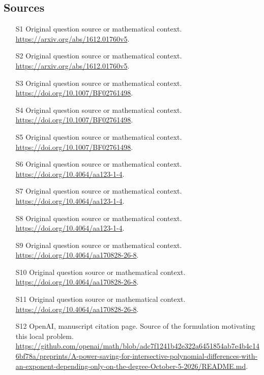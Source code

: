 \documentclass[11pt]{article}
\begin{document}
\subsection{Sources}
\begin{itemize}
\item[S1] Original question source or mathematical context.
\url{https://arxiv.org/abs/1612.01760v5}.
\item[S2] Original question source or mathematical context.
\url{https://arxiv.org/abs/1612.01760v5}.
\item[S3] Original question source or mathematical context.
\url{https://doi.org/10.1007/BF02761498}.
\item[S4] Original question source or mathematical context.
\url{https://doi.org/10.1007/BF02761498}.
\item[S5] Original question source or mathematical context.
\url{https://doi.org/10.1007/BF02761498}.
\item[S6] Original question source or mathematical context.
\url{https://doi.org/10.4064/aa123-1-4}.
\item[S7] Original question source or mathematical context.
\url{https://doi.org/10.4064/aa123-1-4}.
\item[S8] Original question source or mathematical context.
\url{https://doi.org/10.4064/aa123-1-4}.
\item[S9] Original question source or mathematical context.
\url{https://doi.org/10.4064/aa170828-26-8}.
\item[S10] Original question source or mathematical context.
\url{https://doi.org/10.4064/aa170828-26-8}.
\item[S11] Original question source or mathematical context.
\url{https://doi.org/10.4064/aa170828-26-8}.
\item[S12] OpenAI, manuscript citation page. Source of the formulation motivating this local problem.
\url{https://github.com/openai/math/blob/adc7f1241b42e322a6451854ab7e4b4c146bf78a/preprints/A-power-saving-for-intersective-polynomial-differences-with-an-exponent-depending-only-on-the-degree-October-5-2026/README.md}.
\end{itemize}
\end{document}
